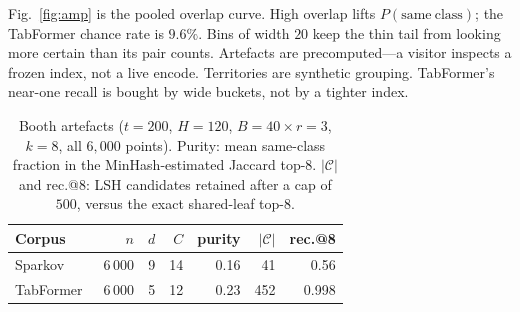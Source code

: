 \documentclass[conference]{IEEEtran}
\begin{document}
Fig.~\ref{fig:amp} is the pooled overlap curve. High overlap lifts $P(\mathrm{same\ class})$; the TabFormer chance rate is $9.6\%$. Bins of width $20$ keep the thin tail from looking more certain than its pair counts. Artefacts are precomputed---a visitor inspects a frozen index, not a live encode. Territories are synthetic grouping. TabFormer's near-one recall is bought by wide buckets, not by a tighter index.

\begin{table}[t]
\centering
\caption{Booth artefacts ($t{=}200$, $H{=}120$, $B{=}40\times r{=}3$, $k{=}8$, all $6{,}000$ points). Purity: mean same-class fraction in the MinHash-estimated Jaccard top-$8$. $|\mathcal{C}|$ and rec.@8: LSH candidates retained after a cap of $500$, versus the exact shared-leaf top-$8$.}
\label{tab:diag}
\renewcommand{\arraystretch}{1.22}
\setlength{\tabcolsep}{3.4pt}
\setlength{\aboverulesep}{0pt}
\setlength{\belowrulesep}{0pt}
\begin{tabular}{lrrrrrr}
\toprule
\rowcolor{headgray}
Corpus & $n$ & $d$ & $C$ & purity & $|\mathcal{C}|$ & rec.@8 \\
\midrule
Sparkov~\cite{Harris2016Sparkov} & 6\,000 & 9 & 14 & 0.16 & 41 & 0.56 \\
\rowcolor{rowgray}
TabFormer~\cite{Padhi2021TabFormer} & 6\,000 & 5 & 12 & 0.23 & 452 & 0.998 \\
\bottomrule
\end{tabular}
\end{table}
\end{document}
